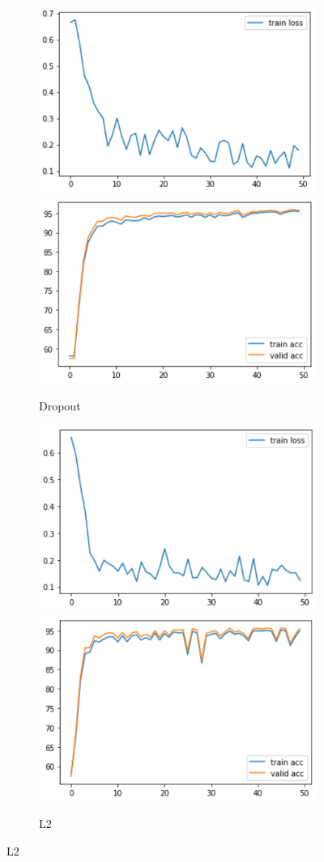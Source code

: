\documentclass[11pt]{article}
\begin{document}
    \begin{figure}[H]
        \begin{subfigure}[H]{1\textwidth}
            \includegraphics[width=0.5\linewidth]{img/Dropout/loss.PNG}
            \includegraphics[width=0.5\linewidth]{img/Dropout/acc.PNG}
            \caption{Dropout}\vspace{2mm}
        \end{subfigure}
        \begin{subfigure}[H]{1\textwidth}
            \includegraphics[width=0.5\linewidth]{img/L2/loss.PNG}
            \includegraphics[width=0.5\linewidth]{img/L2/acc.PNG}
            \caption{L2}\vspace{2mm}
        \end{subfigure}

\end{figure}
\end{document}
